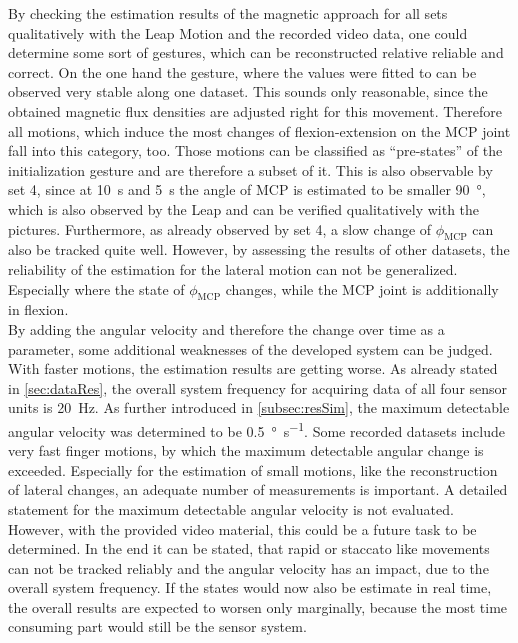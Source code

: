 By checking the estimation results of the magnetic approach for all sets qualitatively with the Leap Motion and the recorded video data, one could determine some sort of gestures, which can be reconstructed relative reliable and correct. On the one hand the gesture, where the values were fitted to can be observed very stable along one dataset. This sounds only reasonable, since the obtained magnetic flux densities are adjusted right for this movement. Therefore all motions, which induce the most changes of flexion-extension on the \ac{MCP} joint fall into this category, too. Those motions can be classified as ``pre-states'' of the initialization gesture and are therefore a subset of it. This is also observable by set 4, since at \SI{10}{\second} and \SI{5}{\second} the angle of \ac{MCP} is estimated to be smaller \SI{90}{\degree}, which is also observed by the Leap and can be verified qualitatively with the pictures. Furthermore, as already observed by set 4, a slow change of $ \phi_{\mathrm{MCP}} $ can also be tracked quite well. However, by assessing the results of other datasets, the reliability of the estimation for the lateral motion can not be generalized. Especially where the state of $ \phi_{\mathrm{MCP}} $ changes, while the \ac{MCP} joint is additionally in flexion.\\ 
By adding the angular velocity and therefore the change over time as a parameter, some additional weaknesses of the developed system can be judged. With faster motions, the estimation results are getting worse. As already stated in \ref{sec:dataRes}, the overall system frequency for acquiring data of all four sensor units is \SI{20}{\Hz}. As further introduced in \ref{subsec:resSim}, the maximum detectable angular velocity was determined to be \SI[per-mode=symbol]{0.5}{\degree \per \second}. Some recorded datasets include very fast finger motions, by which the maximum detectable angular change is exceeded. Especially for the estimation of small motions, like the reconstruction of lateral changes, an adequate number of measurements is important. A detailed statement for the maximum detectable angular velocity is not evaluated. However, with the provided video material, this could be a future task to be determined. In the end it can be stated, that rapid or staccato like movements can not be tracked reliably and the angular velocity has an impact, due to the overall system frequency. If the states would now also be estimate in real time, the overall results are expected to worsen only marginally, because the most time consuming part would still be the sensor system.\\
